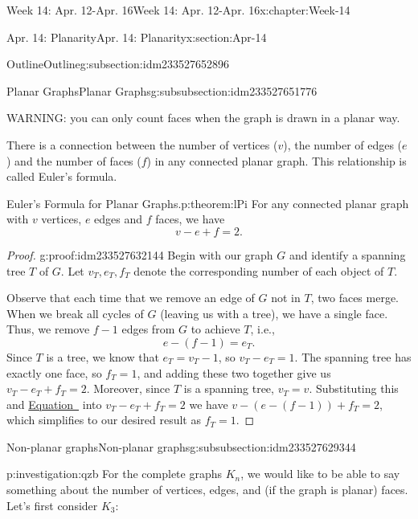 \documentclass[oneside,10pt,]{book}
\numberwithin{equation}{section}
\begin{document}
\begin{chapterptx}{Week 14: Apr. 12-Apr. 16}{}{Week 14: Apr. 12-Apr. 16}{}{}{x:chapter:Week-14}
\begin{sectionptx}{Apr. 14: Planarity}{}{Apr. 14: Planarity}{}{}{x:section:Apr-14}
\begin{subsectionptx}{Outline}{}{Outline}{}{}{g:subsection:idm233527652896}
\begin{subsubsectionptx}{Planar Graphs}{}{Planar Graphs}{}{}{g:subsubsection:idm233527651776}
\par
WARNING: you can only count faces when the graph is drawn in a planar way.%
\par
There is a connection between the number of vertices (\(v\)), the number of edges (\(e\)) and the number of faces (\(f\)) in any connected planar graph. This relationship is called Euler's formula.%
\begin{theorem}{Euler's Formula for Planar Graphs.}{}{p:theorem:lPi}%
%
For any connected planar graph with \(v\) vertices, \(e\) edges and \(f\) faces, we have%
\begin{equation*}
v-e + f = 2\text{.}
\end{equation*}
%
\end{theorem}
\begin{proof}{}{g:proof:idm233527632144}
Begin with our graph \(G\) and identify a spanning tree \(T\) of \(G\). Let \(v_T, e_T,  f_T\) denote the corresponding number of each object of \(T\).%
\par
Observe that each time that we remove an edge of \(G\) not in \(T\), two faces merge. When we break all cycles of \(G\) (leaving us with a tree), we have a single face. Thus, we remove \(f-1\) edges from \(G\) to achieve \(T\), i.e.,%
\begin{equation*}
e - (f-1) = e_T\text{.}
\end{equation*}
Since \(T\) is a tree, we know that \(e_T = v_T - 1\), so \(v_T - e_T = 1\). The spanning tree has exactly one face, so \(f_T = 1\), and adding these two together give us \(v_T - e_T + f_T = 2\). Moreover, since \(T\) is a spanning tree, \(v_T = v\). Substituting this and \hyperref[x:me:eq-euler-formula-proof1]{Equation~} into \(v_T - e_T + f_T = 2\) we have \(v - (e-(f-1))+f_T = 2\), which simplifies to our desired result as \(f_T = 1\).%
\end{proof}
\end{subsubsectionptx}
%
%
\typeout{************************************************}
\typeout{************************************************}
%
\begin{subsubsectionptx}{Non-planar graphs}{}{Non-planar graphs}{}{}{g:subsubsection:idm233527629344}
%
%
\begin{investigation}{}{p:investigation:qzb}%
For the complete graphs \(K_n\), we would like to be able to say something about the number of vertices, edges, and (if the graph is planar) faces. Let's first consider \(K_3\):%

\end{investigation}
\end{subsubsectionptx}
\end{subsectionptx}
\end{sectionptx}
\end{chapterptx}
\end{document}
